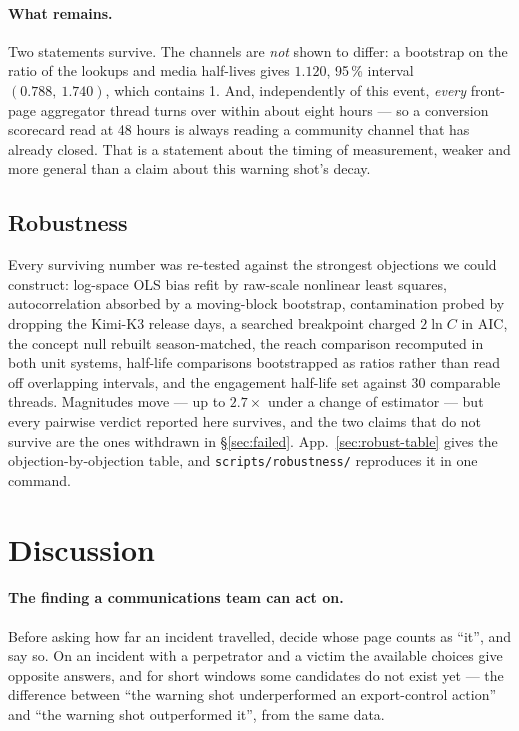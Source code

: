 \documentclass[11pt,a4paper]{article}
\begin{document}
\paragraph{What remains.} Two statements survive. The channels are \emph{not}
shown to differ: a bootstrap on the ratio of the lookups and media half-lives
gives $1.120$, 95\,\% interval $(0.788,\ 1.740)$, which contains 1. And,
independently of this event, \emph{every} front-page aggregator thread turns
over within about eight hours --- so a conversion scorecard read at 48 hours is
always reading a community channel that has already closed. That is a statement
about the timing of measurement, weaker and more general than a claim about this
warning shot's decay.

\subsection{Robustness}
\label{sec:robust}

Every surviving number was re-tested against the strongest objections we could
construct: log-space OLS bias refit by raw-scale nonlinear least squares,
autocorrelation absorbed by a moving-block bootstrap, contamination probed by
dropping the Kimi-K3 release days, a searched breakpoint charged $2\ln C$ in
AIC, the concept null rebuilt season-matched, the reach comparison recomputed in
both unit systems, half-life comparisons bootstrapped as ratios rather than read
off overlapping intervals, and the engagement half-life set against 30
comparable threads. Magnitudes move --- up to $2.7\times$ under a change of
estimator --- but every pairwise verdict reported here survives, and the two
claims that do not survive are the ones withdrawn in §\ref{sec:failed}.
App.~\ref{sec:robust-table} gives the objection-by-objection table, and
\texttt{scripts/robustness/} reproduces it in one command.

\section{Discussion}
\label{sec:discussion}

\paragraph{The finding a communications team can act on.} Before asking how far
an incident travelled, decide whose page counts as ``it'', and say so. On an
incident with a perpetrator and a victim the available choices give opposite
answers, and for short windows some candidates do not exist yet --- the
difference between ``the warning shot underperformed an export-control action''
and ``the warning shot outperformed it'', from the same data.
\end{document}
